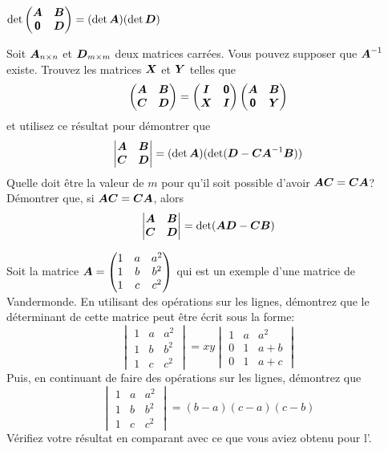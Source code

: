\begin{TwoCol}
\begin{exercice}
\[\]
$\displaystyle \det \begin{pmatrix}
\boldsymbol{A} & \boldsymbol{B} \\
\mbox{\textsf{\textbf{{0}}}} & \boldsymbol{D}
\end{pmatrix} = (\det \boldsymbol{A})(\det\boldsymbol{D})$
\end{exercice}
\begin{exercice}
Soit $\boldsymbol{A}_{n\times n}$ et $\boldsymbol{D}_{m\times m}$ deux matrices carrées. 
Vous pouvez supposer que $\boldsymbol{A}^{-1}$ existe.
 Trouvez les matrices $\boldsymbol{X}$ et $\boldsymbol{Y}$ telles que
\[
\begin{pmatrix}
\boldsymbol{A} & \boldsymbol{B} \\ \boldsymbol{C} & \boldsymbol{D}
\end{pmatrix}
= \begin{pmatrix}
\boldsymbol{I} & \mbox{\textsf{\textbf{{0}}}} \\ \boldsymbol{X} & \boldsymbol{I}
\end{pmatrix}
\begin{pmatrix}
\boldsymbol{A} & \boldsymbol{B} \\ \mbox{\textsf{\textbf{{0}}}} & \boldsymbol{Y}
\end{pmatrix}
\]
et utilisez ce résultat pour démontrer que
\[
\begin{vmatrix}
\boldsymbol{A} & \boldsymbol{B} \\ \boldsymbol{C} & \boldsymbol{D}
\end{vmatrix} = (\det\boldsymbol{A})(\det(\boldsymbol{D}-\boldsymbol{C}\boldsymbol{A}^{-1}\boldsymbol{B}))
\]
 Quelle doit être la valeur de $m$ pour qu'il soit possible d'avoir $\boldsymbol{A}\boldsymbol{C} = \boldsymbol{C}\boldsymbol{A}$?
 Démontrer que, si $\boldsymbol{A}\boldsymbol{C} = \boldsymbol{C}\boldsymbol{A}$, alors
\[
\begin{vmatrix}
\boldsymbol{A} & \boldsymbol{B} \\ \boldsymbol{C} & \boldsymbol{D}
\end{vmatrix} = \det (\boldsymbol{A}\boldsymbol{D} - \boldsymbol{C}\boldsymbol{B})
\]
\end{exercice}
\begin{exercice}
Soit la matrice $\displaystyle \boldsymbol{A} = \begin{pmatrix}
1 & a & a^2 \\
1 & b & b^2 \\
1 & c & c^2
\end{pmatrix}$
qui est un exemple d'une matrice de Vandermonde. En utilisant des opérations sur les lignes,
démontrez que le déterminant de cette matrice peut être écrit sous la forme:
\[
\begin{vmatrix}
1 & a & a^2 \\
1 & b & b^2 \\
1 & c & c^2
\end{vmatrix} = x y \begin{vmatrix}
1 & a & a^2 \\
0 & 1 & a+b\\
0 & 1 & a+c
\end{vmatrix}
\]
Puis, en continuant de faire des opérations sur les lignes, démontrez que
\[
\begin{vmatrix}
1 & a & a^2 \\
1 & b & b^2 \\
1 & c & c^2
\end{vmatrix} = (b-a)(c-a)(c-b)
\]
Vérifiez votre résultat en comparant avec ce que vous aviez obtenu pour l'.
\end{exercice}


\end{TwoCol}